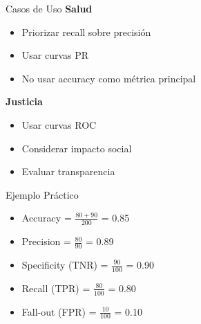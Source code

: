 \documentclass{beamer}
\begin{document}
\begin{frame}{Casos de Uso}
    \textbf{Salud}
    \begin{itemize}
        \item Priorizar recall sobre precisión
        \item Usar curvas PR
        \item No usar accuracy como métrica principal
    \end{itemize}
    
    \vspace{0.5em}
    
    \textbf{Justicia}
    \begin{itemize}
        \item Usar curvas ROC
        \item Considerar impacto social
        \item Evaluar transparencia
    \end{itemize}
\end{frame}

\begin{frame}{Ejemplo Práctico}
    \begin{center}
    \end{center}
    
    \begin{itemize}
        \item Accuracy = $\frac{80 + 90}{200}$ = 0.85
        \item Precision = $\frac{80}{90}$ = 0.89
        \item Specificity (TNR) = $\frac{90}{100}$ = 0.90
        \item Recall (TPR) = $\frac{80}{100}$ = 0.80
        \item Fall-out (FPR) = $\frac{10}{100}$ = 0.10
    \end{itemize}
\end{frame}
\end{document}
